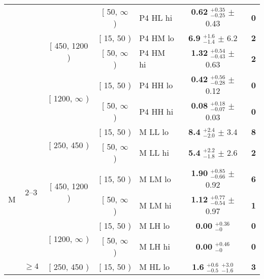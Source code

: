 \begin{table}[htbp]
\begin{tabular}{cccclcc}
& & & [ 50, $\infty$ ) & P4 HL hi & \textbf{0.62} $^{+0.35}_{-0.25}$ $\pm$ 0.43  & \textbf{0}\\ %

& & \multirow{2}{*}{[ 450, 1200 )} & [ 15, 50 ) & P4 HM lo & \textbf{6.9} $^{+1.6}_{-1.4}$ $\pm$ 6.2  & \textbf{2}\\ %

& & & [ 50, $\infty$ ) & P4 HM hi & \textbf{1.32} $^{+0.54}_{-0.43}$ $\pm$ 0.63  & \textbf{2}\\ %

& & \multirow{2}{*}{[ 1200, $\infty$ )} & [ 15, 50 ) & P4 HH lo & \textbf{0.42} $^{+0.56}_{-0.28}$ $\pm$ 0.12  & \textbf{0}\\ %

& & & [ 50, $\infty$ ) & P4 HH hi & \textbf{0.08} $^{+0.18}_{-0.07}$ $\pm$ 0.03  & \textbf{0}\\ %

\hline

\multirow{12}{*}{M} 

& \multirow{6}{*}{2--3} & \multirow{2}{*}{[ 250, 450 )} & [ 15, 50 ) & M LL lo & \textbf{8.4} $^{+2.4}_{-2.0}$ $\pm$ 3.4  & \textbf{8}\\ %

& & & [ 50, $\infty$ ) & M LL hi & \textbf{5.4} $^{+2.2}_{-1.8}$ $\pm$ 2.6  & \textbf{2}\\ %

& & \multirow{2}{*}{[ 450, 1200 )} & [ 15, 50 ) & M LM lo & \textbf{1.90} $^{+0.85}_{-0.66}$ $\pm$ 0.92  & \textbf{6}\\ %

& & & [ 50, $\infty$ ) & M LM hi & \textbf{1.12} $^{+0.77}_{-0.54}$ $\pm$ 0.97  & \textbf{1}\\ %

& & \multirow{2}{*}{[ 1200, $\infty$ )} & [ 15, 50 ) & M LH lo & \textbf{0.00} $^{+0.36}_{-0}$  & \textbf{0}\\ %

& & & [ 50, $\infty$ ) & M LH hi & \textbf{0.00} $^{+0.46}_{-0}$  & \textbf{0}\\ %

%

& \multirow{6}{*}{$\geq 4$} & \multirow{2}{*}{[ 250, 450 )} & [ 15, 50 ) & M HL lo & \textbf{1.6} $^{+0.6}_{-0.5}$ $^{+3.0}_{-1.6}$  & \textbf{3}\\ %


\end{tabular}
\end{table}
